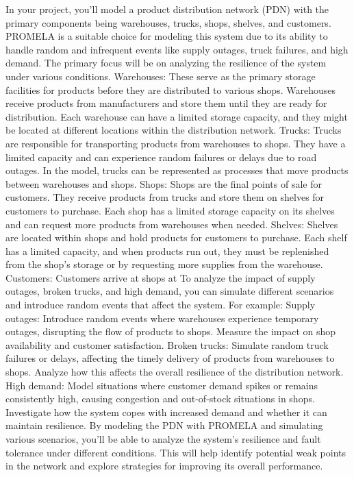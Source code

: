 \documentclass[12pt]{report}
\begin{document}
In your project, you'll model a product distribution network (PDN) with the primary components being warehouses, trucks, shops, shelves, and customers. PROMELA is a suitable choice for modeling this system due to its ability to handle random and infrequent events like supply outages, truck failures, and high demand. The primary focus will be on analyzing the resilience of the system under various conditions.
Warehouses: These serve as the primary storage facilities for products before they are distributed to various shops. Warehouses receive products from manufacturers and store them until they are ready for distribution. Each warehouse can have a limited storage capacity, and they might be located at different locations within the distribution network.
Trucks: Trucks are responsible for transporting products from warehouses to shops. They have a limited capacity and can experience random failures or delays due to road outages. In the model, trucks can be represented as processes that move products between warehouses and shops.
Shops: Shops are the final points of sale for customers. They receive products from trucks and store them on shelves for customers to purchase. Each shop has a limited storage capacity on its shelves and can request more products from warehouses when needed.
Shelves: Shelves are located within shops and hold products for customers to purchase. Each shelf has a limited capacity, and when products run out, they must be replenished from the shop's storage or by requesting more supplies from the warehouse.
Customers: Customers arrive at shops at
To analyze the impact of supply outages, broken trucks, and high demand, you can simulate different scenarios and introduce random events that affect the system. For example:
Supply outages: Introduce random events where warehouses experience temporary outages, disrupting the flow of products to shops. Measure the impact on shop availability and customer satisfaction.
Broken trucks: Simulate random truck failures or delays, affecting the timely delivery of products from warehouses to shops. Analyze how this affects the overall resilience of the distribution network.
High demand: Model situations where customer demand spikes or remains consistently high, causing congestion and out-of-stock situations in shops. Investigate how the system copes with increased demand and whether it can maintain resilience.
By modeling the PDN with PROMELA and simulating various scenarios, you'll be able to analyze the system's resilience and fault tolerance under different conditions. This will help identify potential weak points in the network and explore strategies for improving its overall performance.
\end{document}
